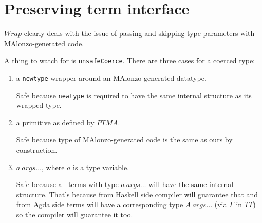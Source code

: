 \section{Preserving term interface}

\(Wrap\) clearly deals with the issue of passing and skipping type parameters with
MAlonzo-generated code.

A thing to watch for is \texttt{unsafeCoerce}.
There are three cases for a coerced type:
\begin{enumerate}
\item a \texttt{newtype} wrapper around an MAlonzo-generated datatype.

   Safe because \texttt{newtype} is required to have the same
   internal structure as its wrapped type.
\item a primitive as defined by \(PTMA\).

   Safe because type of MAlonzo-generated code is the same as ours by construction.
\item \(a\ args\ldots\), where \(a\) is a type variable.

   Safe because all terms with type \(a\ args\ldots\) will have the same internal
   structure. That's because from Haskell side compiler will guarantee that and
   from Agda side terms will have a corresponding type \(A\ args\ldots\) (via \(\Gamma\) in \(TT\))
   so the compiler will guarantee it too.
\end{enumerate}
